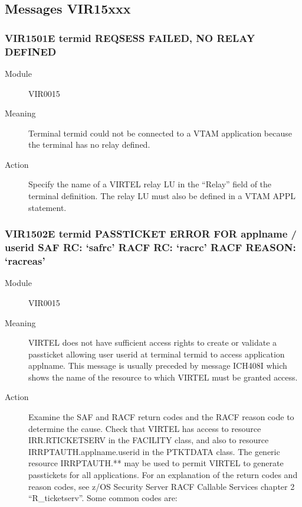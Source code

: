 \documentclass[letterpaper,10pt,english]{sphinxmanual}
\begin{document}
\subsection{Messages VIR15xxx}
\label{\detokenize{messages:messages-vir15xxx}}

\subsubsection{VIR1501E termid REQSESS FAILED, NO RELAY DEFINED}
\label{\detokenize{messages:vir1501e-termid-reqsess-failed-no-relay-defined}}\begin{description}
\item[{Module}] \leavevmode
VIR0015

\item[{Meaning}] \leavevmode
Terminal termid could not be connected to a VTAM application because the terminal has no relay defined.

\item[{Action}] \leavevmode
Specify the name of a VIRTEL relay LU in the “Relay” field of the terminal definition. The relay LU must also be defined in a VTAM APPL statement.

\end{description}


\subsubsection{VIR1502E termid PASSTICKET ERROR FOR applname / userid SAF RC: ‘safrc’ RACF RC: ‘racrc’ RACF REASON: ‘racreas’}
\label{\detokenize{messages:vir1502e-termid-passticket-error-for-applname-userid-saf-rc-safrc-racf-rc-racrc-racf-reason-racreas}}\begin{description}
\item[{Module}] \leavevmode
VIR0015

\item[{Meaning}] \leavevmode
VIRTEL does not have sufficient access rights to create or validate a passticket allowing user userid at terminal termid to access application applname. This message is usually preceded by message ICH408I which shows the name of the resource to which VIRTEL must be granted access.

\item[{Action}] \leavevmode
Examine the SAF and RACF return codes and the RACF reason code to determine the cause. Check that VIRTEL has access to resource IRR.RTICKETSERV in the FACILITY class, and also to resource IRRPTAUTH.applname.userid in the PTKTDATA class. The generic resource IRRPTAUTH.** may be used to permit VIRTEL to generate passtickets for all applications.
For an explanation of the return codes and reason codes, see z/OS Security Server RACF Callable Services chapter 2 “R\_ticketserv”. Some common codes are:

\end{description}
\end{document}
